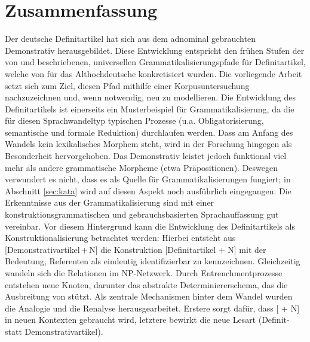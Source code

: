   
\section{Zusammenfassung}

Der deutsche Definitartikel hat sich aus dem adnominal gebrauchten Demonstrativ  herausgebildet. Diese Entwicklung entspricht den frühen Stufen der von \textcite{Greenberg1978} und \textcite{Lehmann2015} beschriebenen, universellen Grammatikalisierungspfade für Definitartikel, welche von \textcite{Schmuck2014} für das Althochdeutsche konkretisiert wurden. Die vorliegende Arbeit setzt sich zum Ziel, diesen Pfad mithilfe einer Korpusuntersuchung nachzuzeichnen und, wenn notwendig, neu zu modellieren. Die Entwicklung  des Definitartikels ist einerseits ein Musterbeispiel für Grammatikalisierung, da die für diesen Sprachwandeltyp typischen Prozesse (u.a. Obligatorisierung, semantische und formale Reduktion)  durchlaufen werden. Dass am Anfang des Wandels kein lexikalisches Morphem steht, wird in der Forschung hingegen als Besonderheit hervorgehoben. Das Demonstrativ leistet jedoch funktional viel mehr als andere grammatische Morpheme (etwa Präpositionen). Deswegen verwundert es nicht, dass es als Quelle für Grammatikalisierungen fungiert; in Abschnitt \ref{sec:kata} wird auf diesen Aspekt noch ausführlich eingegangen. Die Erkenntnisse aus der Grammatikalisierung sind mit einer konstruktionsgrammatischen und gebrauchsbasierten Sprachauffassung gut vereinbar. Vor diesem Hintergrund kann die Entwicklung des Definitartikels als Konstruktionalisierung betrachtet werden: Hierbei entsteht aus [Demonstrativartikel\,+\,N] die Konstruktion [Definitartikel + N] mit der Bedeutung, Referenten als eindeutig identifizierbar zu kennzeichnen. Gleichzeitig wandeln sich die Relationen im NP-Netzwerk. Durch Entrenchmentprozesse entstehen neue Knoten, darunter das abstrakte Determiniererschema, das die Ausbreitung von  stützt. Als zentrale Mechanismen hinter dem Wandel wurden die Analogie und die Renalyse herausgearbeitet. Erstere sorgt dafür, dass [ + N] in neuen Kontexten gebraucht wird, letztere bewirkt die neue Lesart (Definit- statt Demonstrativartikel). 
